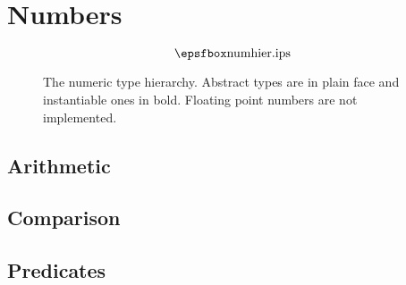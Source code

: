 %
%
%


\chapter{Numbers} \label{numbers}

  
  
  

\begin{figure}[h]
\[ \myepsfbox{numhier.ips} \]
\caption{The numeric type hierarchy.  Abstract types are in plain face
and instantiable ones in bold.  Floating point numbers are not
implemented.} \label{fig:numhier}
\end{figure}

\section{Arithmetic}



\section{Comparison}



\section{Predicates}

